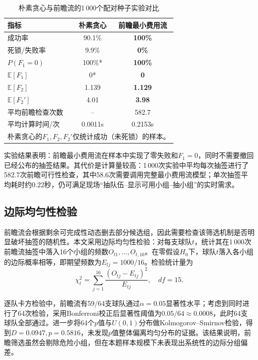 \documentclass[12pt,a4paper]{article}
\begin{document}
\begin{table}[H]
  \centering
  \caption{朴素贪心与前瞻流的1\,000个配对种子实验对比}
  \label{tab:strategy_comparison}
  \small
  \begin{tabular}{lcc}
    \toprule
    指标 & 朴素贪心 & 前瞻最小费用流 \\
    \midrule
    成功率 & 90.1\% & \textbf{100\%} \\
    死锁/失败率 & 9.9\% & \textbf{0\%} \\
    $P(F_1=0)$ & 100\%* & \textbf{100\%} \\
    $\mathbb{E}[F_1]$ & 0* & \textbf{0} \\
    $\mathbb{E}[F_2]$ & 1.139 & \textbf{1.129} \\
    $\mathbb{E}[F_2']$ & 4.01 & \textbf{3.98} \\
    平均前瞻检查次数 & -- & 582.7 \\
    平均计算时间/次 & 0.0011s & 0.2153s \\
    \bottomrule
    \multicolumn{3}{l}{\footnotesize *朴素贪心的$F_1,F_2,F_2'$仅统计成功（未死锁）的样本。}
  \end{tabular}
\end{table}

实验结果表明：前瞻最小费用流在样本中实现了零失败和$F_1=0$，同时不需要撤回已经公布的抽签结果。其代价是计算量较高：1\,000次实验中平均每次抽签进行了582.7次前瞻可行性检查，其中58.6次需要调用完整最小费用流模型；单次抽签平均耗时约0.22秒，仍可满足现场“抽队伍--显示可用小组--抽小组”的实时需求。

\subsection{边际均匀性检验}

前瞻流会根据剩余可完成性动态删去部分候选组，因此需要检查该筛选机制是否明显破坏抽签的随机性。本文采用边际均匀性检验：对每支球队$t$，统计其在1\,000次前瞻流抽签中落入16个小组的频数$O_{t1},\dots,O_{t,16}$。在零假设$H_0$下，球队$t$落入各小组的边际概率相等，即期望频数为$E_{tj}=1000/16$。检验统计量为
\begin{equation}
  \chi_t^2=\sum_{j=1}^{16}\frac{(O_{tj}-E_{tj})^2}{E_{tj}},\quad df=15.
\end{equation}

逐队卡方检验中，前瞻流有59/64支球队通过$\alpha=0.05$显著性水平；考虑到同时进行了64次检验，采用Bonferroni校正后显著性阈值为$0.05/64\approx0.0008$，此时64支球队全部通过。进一步将64个$p$值与$U(0,1)$分布做Kolmogorov--Smirnov检验，得到$D=0.0947,p=0.5816$，未发现$p$值整体偏离均匀分布的证据。该结果说明，前瞻筛选虽然会剔除危险小组，但在本题样本规模下未表现出系统性的边际分组偏差。
\end{document}
